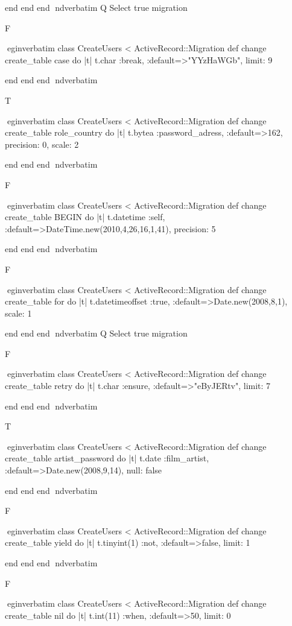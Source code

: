     end 
  end 
end
nd{verbatim}
Q
 Select true migration

F

egin{verbatim}
 class CreateUsers < ActiveRecord::Migration 
  def change 
    create_table case do |t| 
      t.char :break, :default=>"YYzHaWGb", limit: 9
    
    end 
  end 
end
nd{verbatim}

T

egin{verbatim}
 class CreateUsers < ActiveRecord::Migration 
  def change 
    create_table role_country do |t| 
      t.bytea :password_adress, :default=>162, precision: 0, scale: 2
    
    end 
  end 
end
nd{verbatim}

F

egin{verbatim}
 class CreateUsers < ActiveRecord::Migration 
  def change 
    create_table BEGIN do |t| 
      t.datetime :self, :default=>DateTime.new(2010,4,26,16,1,41), precision: 5
    
    end 
  end 
end
nd{verbatim}

F

egin{verbatim}
 class CreateUsers < ActiveRecord::Migration 
  def change 
    create_table for do |t| 
      t.datetimeoffset :true, :default=>Date.new(2008,8,1), scale: 1
    
    end 
  end 
end
nd{verbatim}
Q
 Select true migration

F

egin{verbatim}
 class CreateUsers < ActiveRecord::Migration 
  def change 
    create_table retry do |t| 
      t.char :ensure, :default=>"eByJERtv", limit: 7
    
    end 
  end 
end
nd{verbatim}

T

egin{verbatim}
 class CreateUsers < ActiveRecord::Migration 
  def change 
    create_table artist_password do |t| 
      t.date :film_artist, :default=>Date.new(2008,9,14), null: false
    
    end 
  end 
end
nd{verbatim}

F

egin{verbatim}
 class CreateUsers < ActiveRecord::Migration 
  def change 
    create_table yield do |t| 
      t.tinyint(1) :not, :default=>false, limit: 1
    
    end 
  end 
end
nd{verbatim}

F

egin{verbatim}
 class CreateUsers < ActiveRecord::Migration 
  def change 
    create_table nil do |t| 
      t.int(11) :when, :default=>50, limit: 0
    
